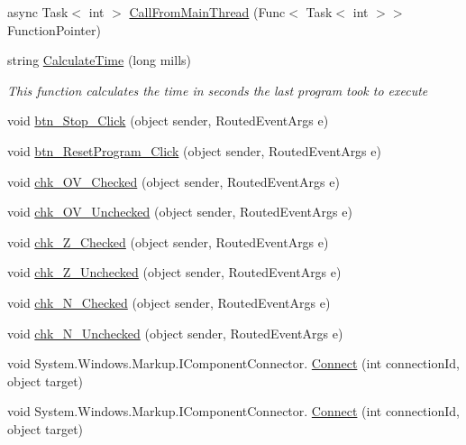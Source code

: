\begin{DoxyCompactItemize}
async Task$<$ int $>$ \hyperlink{class_c_p_u___o_s___simulator_1_1_main_window_a0712c91c3a03a4fabc2cdb2f4ed0a33b}{Call\+From\+Main\+Thread} (Func$<$ Task$<$ int $>$$>$ Function\+Pointer)
\item 
string \hyperlink{class_c_p_u___o_s___simulator_1_1_main_window_af436535e8368accea735ff7672fa83d9}{Calculate\+Time} (long mills)
\begin{DoxyCompactList}\small\item\em This function calculates the time in seconds the last program took to execute \end{DoxyCompactList}\item 
void \hyperlink{class_c_p_u___o_s___simulator_1_1_main_window_acbdc92abd94c317f978cee0d28af9448}{btn\+\_\+\+Stop\+\_\+\+Click} (object sender, Routed\+Event\+Args e)
\item 
void \hyperlink{class_c_p_u___o_s___simulator_1_1_main_window_a524b638c053cd53f17e44fe225b9dd4f}{btn\+\_\+\+Reset\+Program\+\_\+\+Click} (object sender, Routed\+Event\+Args e)
\item 
void \hyperlink{class_c_p_u___o_s___simulator_1_1_main_window_a19b793a858804e5f7a5611603aeeaf79}{chk\+\_\+\+O\+V\+\_\+\+Checked} (object sender, Routed\+Event\+Args e)
\item 
void \hyperlink{class_c_p_u___o_s___simulator_1_1_main_window_a59f718f48699e2f35c0151057407c38c}{chk\+\_\+\+O\+V\+\_\+\+Unchecked} (object sender, Routed\+Event\+Args e)
\item 
void \hyperlink{class_c_p_u___o_s___simulator_1_1_main_window_ae6186ab1f27e668a1332b7cf72c70f19}{chk\+\_\+\+Z\+\_\+\+Checked} (object sender, Routed\+Event\+Args e)
\item 
void \hyperlink{class_c_p_u___o_s___simulator_1_1_main_window_a21d19250773a14a89aa8285dbe914c22}{chk\+\_\+\+Z\+\_\+\+Unchecked} (object sender, Routed\+Event\+Args e)
\item 
void \hyperlink{class_c_p_u___o_s___simulator_1_1_main_window_a0d0fff66a2f20f19e86f7d8d25aa8915}{chk\+\_\+\+N\+\_\+\+Checked} (object sender, Routed\+Event\+Args e)
\item 
void \hyperlink{class_c_p_u___o_s___simulator_1_1_main_window_afd6ed1a3f1774365c49977ca74daa906}{chk\+\_\+\+N\+\_\+\+Unchecked} (object sender, Routed\+Event\+Args e)
\item 
void System.\+Windows.\+Markup.\+I\+Component\+Connector. \hyperlink{class_c_p_u___o_s___simulator_1_1_main_window_ae66177a5319cf24975b9dfab71bc830e}{Connect} (int connection\+Id, object target)
\item 
void System.\+Windows.\+Markup.\+I\+Component\+Connector. \hyperlink{class_c_p_u___o_s___simulator_1_1_main_window_ae66177a5319cf24975b9dfab71bc830e}{Connect} (int connection\+Id, object target)
\end{DoxyCompactItemize}
